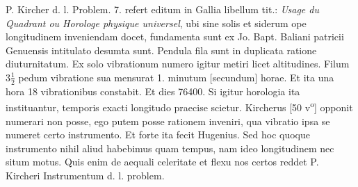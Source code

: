  \pstart P. Kircher\protect{} d. l. Problem. 7. refert editum in Gallia\protect{} libellum tit.: \textit{Usage du Quadrant ou Horologe physique universel}, ubi sine solis\protect{} et siderum\protect{} ope longitudinem\protect{} inveniendam  docet, fundamenta sunt ex Jo. Bapt. Baliani\protect{} patricii Genuensis  intitulato desumta sunt. Pendula fila sunt in duplicata ratione diuturnitatum. Ex solo vibrationum numero igitur metiri licet altitudines. Filum $\displaystyle 3\frac{1}{2}$ pedum vibratione sua mensurat 1. minutum [secundum] horae. Et ita una hora 18 vibrationibus constabit. Et dies 76400. Si igitur horologia\protect{} ita instituantur, temporis exacti longitudo\protect{} praecise scietur. Kircherus\protect{}
 [50 v\textsuperscript{o}] opponit numerari non posse, ego putem posse rationem inveniri, qua vibratio ipsa se numeret certo instrumento. Et forte ita fecit Hugenius\protect{}. Sed hoc quoque instrumento nihil aliud habebimus quam tempus, nam ideo longitudinem\protect{} nec situm motus. Quis enim de aequali celeritate et flexu nos certos reddet P. Kircheri\protect{} Instrumentum  d. l. problem. 
